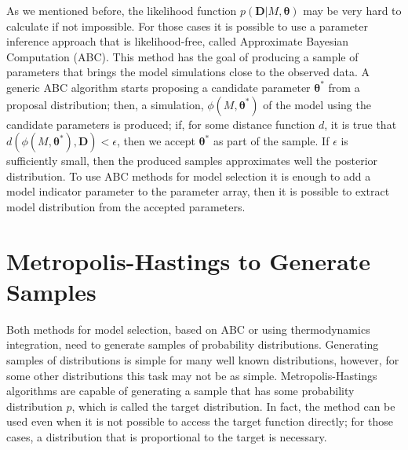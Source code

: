 As we mentioned before, the likelihood function 
$p({\bm D} | M, {\bm \theta})$ may be very hard to calculate if not 
impossible. For those cases it is possible to use a parameter inference
approach that is likelihood-free, called Approximate Bayesian 
Computation (ABC). This method has the goal of producing a sample of 
parameters that brings the model simulations close to the observed data.
A generic ABC algorithm starts proposing a candidate parameter 
${\bm \theta}^*$ from a proposal distribution; then, a simulation, 
$\phi (M, {\bm \theta}^*)$ of the model using the candidate parameters
is produced; if, for some distance function $d$, it is true that 
$d(\phi(M, {\bm \theta}^*), {\bm D}) < \epsilon$, then we accept 
${\bm \theta}^*$ as part of the sample. If $\epsilon$ is sufficiently 
small, then the produced samples approximates well the posterior 
distribution. To use ABC methods for model selection it is enough to add
a model indicator parameter to the parameter array, then it is possible
to extract model distribution from the accepted parameters.

\section{Metropolis-Hastings to Generate Samples}
Both methods for model selection, based on ABC or using thermodynamics
integration, need to generate samples of probability distributions. 
Generating samples of distributions is simple for many well known 
distributions, however, for some other distributions this task may not 
be as simple. Metropolis-Hastings algorithms are capable of generating a 
sample that has some probability distribution $p$, which is called the 
target distribution. In fact, the method can be used even when it is not
possible to access the target function directly; for those cases, a 
distribution that is proportional to the target is necessary.

